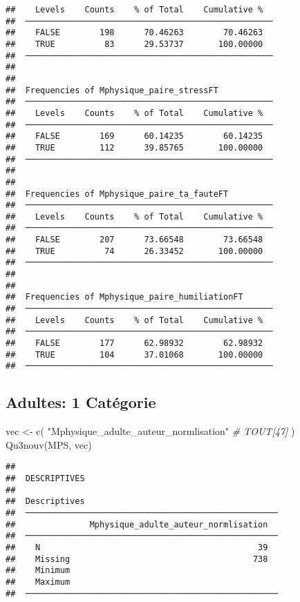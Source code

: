 \documentclass[
]{article}
\newenvironment{Shaded}{\begin{snugshade}}{\end{snugshade}}
\newcommand{\CommentTok}[1]{\textcolor[rgb]{0.56,0.35,0.01}{\textit{#1}}}
\newcommand{\FunctionTok}[1]{\textcolor[rgb]{0.00,0.00,0.00}{#1}}
\newcommand{\NormalTok}[1]{#1}
\newcommand{\OtherTok}[1]{\textcolor[rgb]{0.56,0.35,0.01}{#1}}
\newcommand{\StringTok}[1]{\textcolor[rgb]{0.31,0.60,0.02}{#1}}
\begin{document}
\begin{verbatim}
##    Levels    Counts    % of Total    Cumulative %   
##  ────────────────────────────────────────────────── 
##    FALSE        198      70.46263        70.46263   
##    TRUE          83      29.53737       100.00000   
##  ────────────────────────────────────────────────── 
## 
## 
##  Frequencies of Mphysique_paire_stressFT            
##  ────────────────────────────────────────────────── 
##    Levels    Counts    % of Total    Cumulative %   
##  ────────────────────────────────────────────────── 
##    FALSE        169      60.14235        60.14235   
##    TRUE         112      39.85765       100.00000   
##  ────────────────────────────────────────────────── 
## 
## 
##  Frequencies of Mphysique_paire_ta_fauteFT          
##  ────────────────────────────────────────────────── 
##    Levels    Counts    % of Total    Cumulative %   
##  ────────────────────────────────────────────────── 
##    FALSE        207      73.66548        73.66548   
##    TRUE          74      26.33452       100.00000   
##  ────────────────────────────────────────────────── 
## 
## 
##  Frequencies of Mphysique_paire_humiliationFT       
##  ────────────────────────────────────────────────── 
##    Levels    Counts    % of Total    Cumulative %   
##  ────────────────────────────────────────────────── 
##    FALSE        177      62.98932        62.98932   
##    TRUE         104      37.01068       100.00000   
##  ──────────────────────────────────────────────────
\end{verbatim}

\hypertarget{adultes-1-catuxe9gorie}{%
\subsection{Adultes: 1 Catégorie}\label{adultes-1-catuxe9gorie}}

\begin{Shaded}
\begin{Highlighting}[]
\NormalTok{vec }\OtherTok{\textless{}{-}} \FunctionTok{c}\NormalTok{(}
  \StringTok{"Mphysique\_adulte\_auteur\_normlisation"}   \CommentTok{\# TOUT[47]}
\NormalTok{  )  }
\FunctionTok{Qu3nouv}\NormalTok{(MPS, vec)}
\end{Highlighting}
\end{Shaded}

\begin{verbatim}
## 
##  DESCRIPTIVES
## 
##  Descriptives                                        
##  ─────────────────────────────────────────────────── 
##               Mphysique_adulte_auteur_normlisation   
##  ─────────────────────────────────────────────────── 
##    N                                            39   
##    Missing                                     738   
##    Minimum                                           
##    Maximum                                           
##  ───────────────────────────────────────────────────
\end{verbatim}
\end{document}
